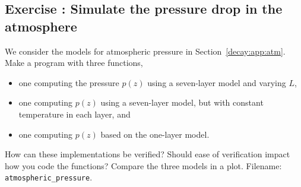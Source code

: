 \documentclass[%
oneside,                 %
final,                   %
10pt]{article}
\newenvironment{doconceexercise}{}{}
\newcounter{doconceexercisecounter}
\begin{document}




\begin{doconceexercise}

\subsection*{Exercise \thedoconceexercisecounter: Simulate the pressure drop in the atmosphere}

\label{decay:app:exer:atm1}

We consider the models for atmospheric pressure in
Section~\ref{decay:app:atm}.
Make a program with three functions,

\begin{itemize}
 \item one computing the pressure $p(z)$ using a seven-layer model
   and varying $L$,

 \item one computing $p(z)$ using a seven-layer model,
   but with constant temperature in each layer, and

 \item one computing $p(z)$ based on the
   one-layer model.
\end{itemize}

\noindent
How can these implementations be verified? Should ease of verification
impact how you code the functions?
Compare the three models in a plot.
\noindent Filename: \Verb!atmospheric_pressure!.

\end{doconceexercise}
\end{document}
